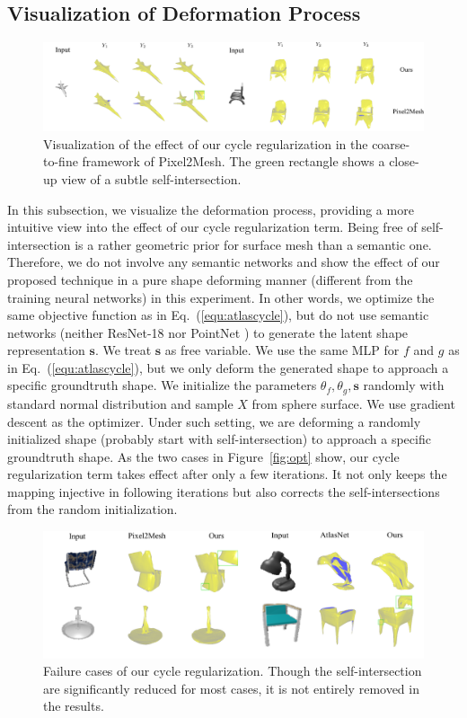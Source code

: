 \subsection{Visualization of Deformation Process}
\label{subsec:deform}
\begin{figure}
	\centering
	\includegraphics[width=\textwidth]{img/p2m/3level}
	\caption{Visualization of the effect of our cycle regularization in the coarse-to-fine framework of Pixel2Mesh. The green rectangle shows a close-up view of a subtle self-intersection.}
	\label{fig:3level}
\end{figure}
In this subsection, we visualize the deformation process, providing a more intuitive view into the effect of our cycle regularization term. Being free of self-intersection is a rather geometric prior for surface mesh than a semantic one. Therefore, we do not involve any semantic networks and show the effect of our proposed technique in a pure shape deforming manner (different from the training neural networks) in this experiment. In other words, we optimize the same objective function as in Eq.~(\ref{equ:atlascycle}), but do not use semantic networks (neither ResNet-18 \cite{resnet} nor PointNet \cite{pointnet}) to generate the latent shape representation $\mathbf{s}$. We treat $\mathbf{s}$ as free variable.  We use the same MLP for $f$ and $g$ as in Eq.~(\ref{equ:atlascycle}), but we only deform the generated shape to approach a specific groundtruth shape. We initialize the parameters $\theta_f,\theta_g,\mathbf{s}$ randomly with standard normal distribution and sample $X$ from sphere surface. We use gradient descent as the optimizer. Under such setting, we are deforming a randomly initialized shape (probably start with self-intersection) to approach a specific groundtruth shape. As the two cases in Figure~\ref{fig:opt} show, our cycle regularization term takes effect after only a few iterations. It not only keeps the mapping injective in following iterations but also corrects the self-intersections from the random initialization.

\begin{figure}
	\centering
	\includegraphics[width=\textwidth]{img/limit/limit}
	\caption{Failure cases of our cycle regularization. Though the self-intersection are significantly reduced for most cases, it is not entirely removed in the results.}
	\label{fig:limit}
\end{figure}

